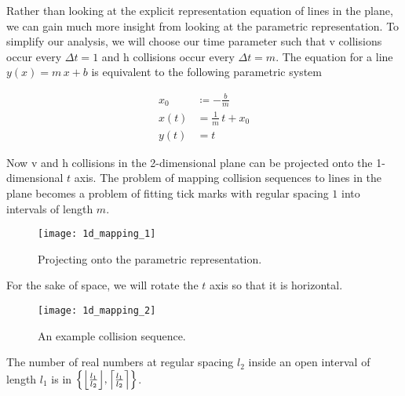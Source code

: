 
Rather than looking at the explicit representation equation of lines in the plane, we can gain much more insight from looking at the parametric representation. To simplify our analysis, we will choose our time parameter such that v collisions occur every $\Delta t = 1$ and h collisions occur every $\Delta t = m$. The equation for a line $y(x) = m \, x + b$ is equivalent to the following parametric system

\begin{align}\label{eq:parametric-line}
	x_0& \coloneqq - \frac{b}{m}\\
	x(t)& = \frac{1}{m} \, t + x_0\\
	y(t)& = t
\end{align}

Now v and h collisions in the 2-dimensional plane can be projected onto the 1-dimensional $t$ axis. The problem of mapping collision sequences to lines in the plane becomes a problem of fitting tick marks with regular spacing $1$ into intervals of length $m$.

\begin{figure}[H]
  \begin{center}
    \texttt{[image: 1d\_mapping\_1]}
  \end{center}
  \vspace{-.2in} %
  \caption{\label{fig:1d-projection} Projecting onto the parametric representation.}
\end{figure}

For the sake of space, we will rotate the $t$ axis so that it is horizontal.

\begin{figure}[H]
  \begin{center}
    \texttt{[image: 1d\_mapping\_2]}
  \end{center}
  \vspace{-.2in} %
  \caption{\label{fig:1d-problem} An example collision sequence.}
\end{figure}


\begin{lemma}\label{lem:interval-ticks}
	The number of real numbers at regular spacing $l_2$ inside an open interval of length $l_1$ is in $\cbracket{\floor{\frac{l_1}{l_2}}, \ceil{\frac{l_1}{l_2}}}$.
\end{lemma}

